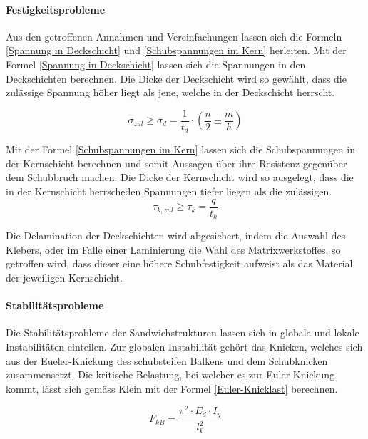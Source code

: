     \paragraph{Festigkeitsprobleme}
    Aus den getroffenen Annahmen und Vereinfachungen lassen sich die Formeln \ref{Spannung in Deckschicht} und \ref{Schubspannungen im Kern} herleiten. Mit der Formel \ref{Spannung in Deckschicht} lassen sich die Spannungen in den Deckschichten berechnen. Die Dicke der Deckschicht wird so gewählt, dass die zulässige Spannung höher liegt als jene, welche in der Deckschicht herrscht.

    \begin{equation}
      \label{Spannung in Deckschicht}
      \sigma_{zul} \geq \sigma_d = \frac{1}{t_d}\cdot \left ( \frac{n}{2} \pm \frac{m}{h}\right )
    \end{equation}

    Mit der Formel \ref{Schubspannungen im Kern} lassen sich die Schubspannungen in der Kernschicht berechnen und somit Aussagen über ihre Resistenz gegenüber dem Schubbruch machen. Die Dicke der Kernschicht wird so ausgelegt, dass die in der Kernschicht herrscheden Spannungen tiefer liegen als die zulässigen.
    \begin{equation}
      \label{Schubspannungen im Kern}
      \tau_{k,zul} \geq \tau_k = \frac{q}{t_k}
    \end{equation}

    Die Delamination der Deckschichten wird abgesichert, indem die Auswahl des Klebers, oder im Falle einer Laminierung die Wahl des Matrixwerkstoffes, so getroffen wird, dass dieser eine höhere Schubfestigkeit aufweist als das Material der jeweiligen Kernschicht.

    \paragraph{Stabilitätsprobleme}
    Die Stabilitätsprobleme der Sandwichstrukturen lassen sich in globale und lokale Instabilitäten einteilen. Zur globalen Instabilität gehört das Knicken, welches sich aus der Eueler-Knickung des schubsteifen Balkens und dem Schubknicken zusammensetzt. Die kritische Belastung, bei welcher es zur Euler-Knickung kommt, lässt sich gemäss Klein \cite{klein} mit der Formel \ref{Euler-Knicklast} berechnen.

    \begin{equation}
      \label{Euler-Knicklast}
      F_{kB}=\frac{\pi^2 \cdot E_d \cdot I_y}{l_k^{2}}
    \end{equation}

